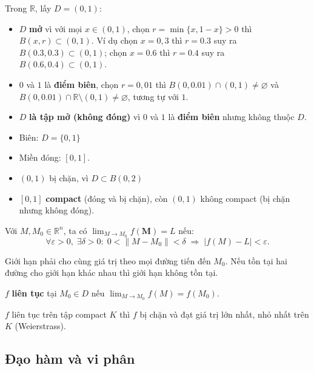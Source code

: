 \documentclass[12pt,a4paper]{article}
\begin{document}
\begin{vidu}[title={Ví dụ}]
  Trong $\mathbb{R}$, lấy $D=(0,1)$:
  \begin{itemize}
    \item $D$ \textbf{mở} vì với mọi $x\in(0,1)$, chọn $r=\min\{x,1-x\}>0$ thì $B(x,r)\subset(0,1)$. Ví dụ chọn $x = 0,3$ thì $r = 0.3$ suy ra $B(0.3, 0.3) \subset (0, 1)$; chọn $x = 0.6$ thì $r = 0.4$ suy ra $B(0.6, 0.4) \subset (0,1)$.
    \item $0$ và $1$ là \textbf{điểm biên}, chọn $r = 0,01$ thì $B(0, 0.01)\cap (0,1) \ne \varnothing$ và $B(0, 0.01)\cap \mathbb{R}\setminus(0,1) \ne \varnothing$, tương tự với $1$.
    \item $D$ \textbf{là tập mở (không đóng)} vì $0$ và $1$ là \textbf{điểm biên} nhưng không thuộc $D$.
    \item Biên: $D=\{0,1\}$
    \item Miền đóng: $[0,1]$.
    \item $(0, 1)$ bị chặn, vì $D \subset B(0, 2)$
    \item $[0,1]$ \textbf{compact} (đóng và bị chặn), còn $(0,1)$ không compact (bị chặn nhưng không đóng).
  \end{itemize}
\end{vidu}

\begin{dinhnghia}[title={Giới hạn hàm nhiều biến}]
    Với $M, M_0 \in \mathbb{R}^n$, ta có $\displaystyle\lim_{M \to M_0} f(\mathbf{M}) = L$ nếu:
  \[
    \forall \varepsilon > 0,\; \exists \delta > 0:\; 0 < \|M - M_0\| < \delta \;\Rightarrow\; |f(M) - L| < \varepsilon.
  \]
\end{dinhnghia}

\begin{luuy}
  Giới hạn phải cho cùng giá trị theo mọi đường tiến đến $M_0$. Nếu tồn tại hai đường cho giới hạn khác nhau thì giới hạn không tồn tại.
\end{luuy}

\begin{dinhnghia}[title={Tính liên tục}]
  $f$ \textbf{liên tục} tại $M_0 \in D$ nếu $\displaystyle\lim_{M \to M_0} f(M) = f(M_0)$.

  $f$ liên tục trên tập compact $K$ thì $f$ bị chặn và đạt giá trị lớn nhất, nhỏ nhất trên $K$ (Weierstrass).
\end{dinhnghia}

\subsection{Đạo hàm và vi phân}
\end{document}

